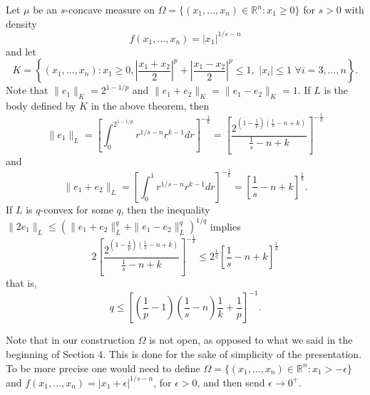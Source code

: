 \documentclass[12pt]{amsart} %
\renewcommand{\[}{\left[}
\renewcommand{\(}{\left(}
\renewcommand{\]}{\right]}
\renewcommand{\)}{\right)}
\renewcommand{\le}{\leqslant}
\renewcommand{\ge}{\geqslant}
\newcommand{\R}{\mathbb R}              %
\begin{document}
Let $\mu$ be an $s$-concave measure on $\Omega=\{(x_1,\ldots,x_n)\in\R^n: x_1\ge 0\}$ for $s>0$ with density $$f(x_1,\ldots,x_n)=|x_1|^{1/s-n}$$
and let
$$
K=\left\{(x_1,\ldots,x_n):  x_1 \ge 0, \left|\frac{x_1+x_2}{2}\right|^p+\left|\frac{x_1-x_2}{2}\right|^p\le 1, \,\, |x_i|\le 1 \,\,\forall i=3,\ldots,n\right\}.
$$
Note that $\|e_1\|_K = 2^{1-1/p}$ and $\|e_1+e_2\|_K=\|e_1-e_2\|_K=1$. If $L$ is the body defined by $K$ in the above theorem, then
$$
\|e_1\|_L = \[\int_0^{2^{1-1/p}}r^{1/s-n}r^{k-1}dr\]^{-\frac 1k}= \[\frac{2^{\(1-\frac 1p\)\(\frac 1s-n+k\)}}{\frac 1s-n+k}\]^{-\frac1k}
$$
and
$$
\|e_1+e_2\|_L = \[\int_0^1 r^{1/s-n}r^{k-1}dr\]^{-\frac 1k}= \[\frac 1s-n+k\]^{\frac 1k}.
$$
If $L$ is $q$-convex for some $q$, then the inequality $\|2e_1\|_L \le \(\|e_1+e_2\|_L^q +\|e_1-e_2\|_L^q\)^{1/q}$ implies
$$
2\[\frac{2^{\(1-\frac 1p\)\(\frac 1s-n+k\)}}{\frac 1s-n+k}\]^{-\frac 1k} \le 2^{\frac 1q}\[\frac 1s-n+k\]^{\frac 1k}
$$
that is,
$$
q\le \[\(\frac 1p-1\)\(\frac 1s-n\)\frac 1k+\frac 1p\]^{-1}.
$$

Note that in our construction $\Omega$ is not open, as opposed to what
we said in the beginning of Section 4. This is done for the sake of simplicity of the
presentation. To be more precise one would need to define
$\Omega=\{(x_1,\ldots,x_n)\in\R^n: x_1>-\epsilon\}$ and
$f(x_1,\ldots,x_n)=|x_1+\epsilon|^{1/s-n}$, for $\epsilon>0$, and then
send $\epsilon \to 0^+$.
\end{document}
